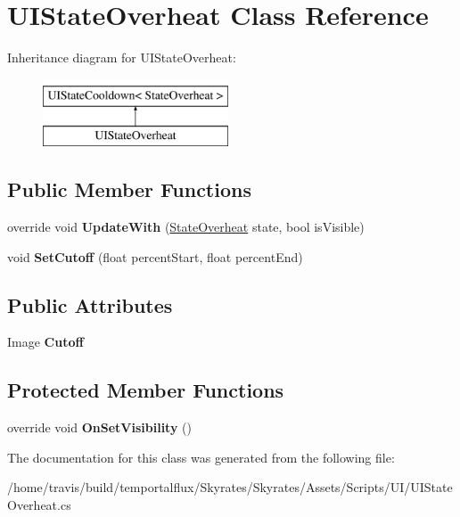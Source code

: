 \hypertarget{class_u_i_state_overheat}{\section{U\-I\-State\-Overheat Class Reference}
\label{class_u_i_state_overheat}
}
Inheritance diagram for U\-I\-State\-Overheat\-:\begin{figure}[H]
\begin{center}
\leavevmode
\includegraphics[height=2.000000cm]{class_u_i_state_overheat}
\end{center}
\end{figure}
\subsection*{Public Member Functions}
\begin{DoxyCompactItemize}
\item 
\hypertarget{class_u_i_state_overheat_a7ada705ea72504f652e1288b398996f6}{override void {\bfseries Update\-With} (\hyperlink{class_skyrates_1_1_misc_1_1_state_overheat}{State\-Overheat} state, bool is\-Visible)}\label{class_u_i_state_overheat_a7ada705ea72504f652e1288b398996f6}

\item 
\hypertarget{class_u_i_state_overheat_a898c47c1051144dfa3f76965004eab6e}{void {\bfseries Set\-Cutoff} (float percent\-Start, float percent\-End)}\label{class_u_i_state_overheat_a898c47c1051144dfa3f76965004eab6e}

\end{DoxyCompactItemize}
\subsection*{Public Attributes}
\begin{DoxyCompactItemize}
\item 
\hypertarget{class_u_i_state_overheat_a9d6c4efe5ccb7967bfee450329a6944e}{Image {\bfseries Cutoff}}\label{class_u_i_state_overheat_a9d6c4efe5ccb7967bfee450329a6944e}

\end{DoxyCompactItemize}
\subsection*{Protected Member Functions}
\begin{DoxyCompactItemize}
\item 
\hypertarget{class_u_i_state_overheat_a01117e928327ef01b0b35d64de8ceee5}{override void {\bfseries On\-Set\-Visibility} ()}\label{class_u_i_state_overheat_a01117e928327ef01b0b35d64de8ceee5}

\end{DoxyCompactItemize}


The documentation for this class was generated from the following file\-:\begin{DoxyCompactItemize}
\item 
/home/travis/build/temportalflux/\-Skyrates/\-Skyrates/\-Assets/\-Scripts/\-U\-I/U\-I\-State\-Overheat.\-cs\end{DoxyCompactItemize}
